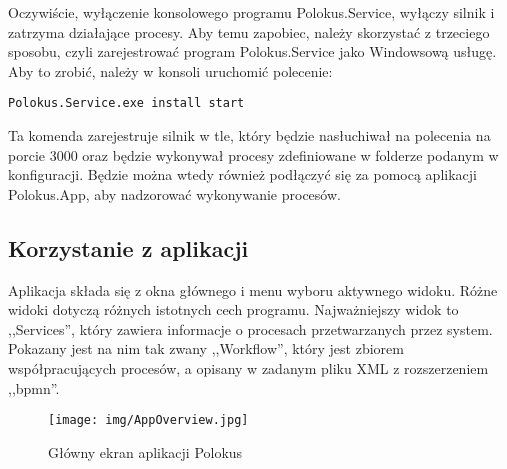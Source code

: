 \documentclass[declaration,shortabstract,mgr]{iithesis}
\begin{document}
Oczywiście, wyłączenie konsolowego programu Polokus.Service, wyłączy silnik i zatrzyma działające procesy. Aby temu zapobiec, należy skorzystać z trzeciego sposobu, czyli zarejestrować program Polokus.Service jako Windowsową usługę. Aby to zrobić, należy w konsoli uruchomić polecenie:

\begin{minipage}[c]{\textwidth}
\centering
\begin{lstlisting}
Polokus.Service.exe install start
\end{lstlisting}
\end{minipage}

\noindent Ta komenda zarejestruje silnik w tle, który będzie nasłuchiwał na polecenia na porcie 3000 oraz będzie wykonywał procesy zdefiniowane w folderze podanym w konfiguracji. Będzie można wtedy również podłączyć się za pomocą aplikacji Polokus.App, aby nadzorować wykonywanie procesów.

\subsection*{Korzystanie z aplikacji}

Aplikacja składa się z okna głównego i menu wyboru aktywnego widoku. Różne widoki dotyczą różnych istotnych cech programu. Najważniejszy widok to ,,Services'', który zawiera informacje o procesach przetwarzanych przez system. Pokazany jest na nim tak zwany ,,Workflow'', który jest zbiorem współpracujących procesów, a opisany w zadanym pliku XML z rozszerzeniem ,,bpmn''.

\begin{figure}[H]
    \texttt{[image: img/AppOverview.jpg]}
    \caption{Główny ekran aplikacji Polokus}
    \label{fig:polokus-app}
\end{figure}
\end{document}
